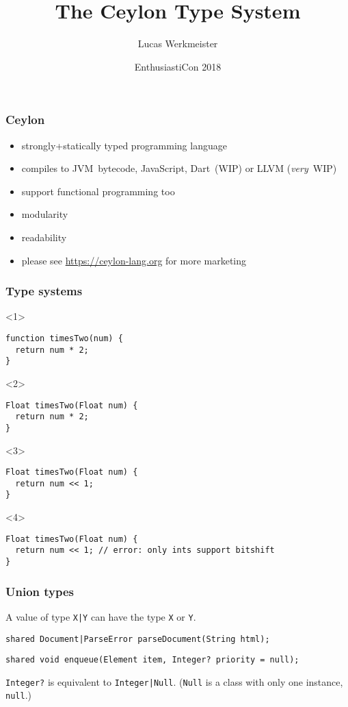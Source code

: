 \documentclass[aspectratio=169]{beamer}
\title{The Ceylon Type System}
\author{Lucas Werkmeister}
\date{EnthusiastiCon 2018}
\begin{document}
\frame{\titlepage}

\begin{frame}
  \frametitle{Ceylon}
  \begin{itemize}
  \item strongly+statically typed programming language
  \item compiles to JVM~bytecode, JavaScript, Dart~(WIP) or LLVM (\emph{very}~WIP)
  \item support functional programming too
  \item modularity
  \item readability
  \item please see \url{https://ceylon-lang.org} for more marketing
  \end{itemize}
\end{frame}

\begin{frame}[fragile]
  \frametitle{Type systems}
  \begin{onlyenv}<1>
    \begin{lstlisting}
function timesTwo(num) {
  return num * 2;
}
    \end{lstlisting}
  \end{onlyenv}
  \begin{onlyenv}<2>
    \begin{lstlisting}
Float timesTwo(Float num) {
  return num * 2;
}
    \end{lstlisting}
  \end{onlyenv}
  \begin{onlyenv}<3>
    \begin{lstlisting}
Float timesTwo(Float num) {
  return num << 1;
}
    \end{lstlisting}
  \end{onlyenv}
  \begin{onlyenv}<4>
    \begin{lstlisting}
Float timesTwo(Float num) {
  return num << 1; // error: only ints support bitshift
}
    \end{lstlisting}
  \end{onlyenv}
\end{frame}

\begin{frame}[fragile]
  \frametitle{Union types}
  A value of type \lstinline{X|Y} can have the type \lstinline{X} or \lstinline{Y}.
  \pause
  \begin{lstlisting}
shared Document|ParseError parseDocument(String html);
  \end{lstlisting}
  \pause
  \begin{lstlisting}
shared void enqueue(Element item, Integer? priority = null);
  \end{lstlisting}
  \pause
  \lstinline{Integer?} is equivalent to \lstinline{Integer|Null}.
  (\lstinline{Null} is a class with only one instance, \lstinline{null}.)
\end{frame}
\end{document}
